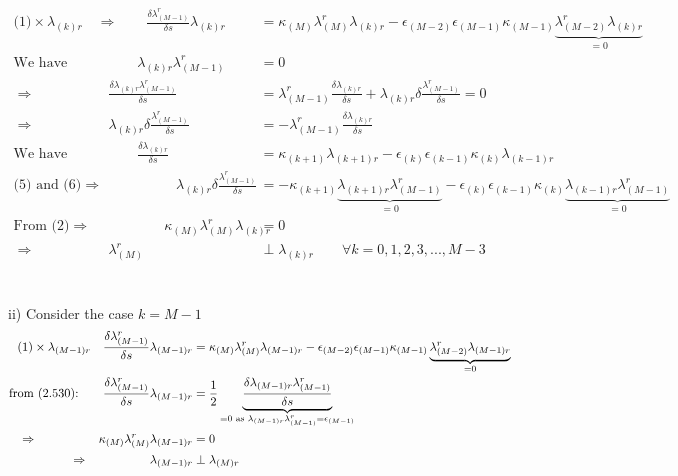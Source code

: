 \begin{align}
\text{(1)}\times \lambda_{(k)r}\quad\Rightarrow\quad\quad \frac{\delta\lambda_{(M-1)}^r}{\delta s}\lambda_{(k)r} &= \kappa_{(M)}\lambda^r_{(M)}\lambda_{(k)r} - \epsilon_{(M-2)}\epsilon_{(M-1)}\kappa_{(M-1)}\underbrace{\lambda^r_{(M-2)}\lambda_{(k)r}}_{=0}\\
\text{We have}  \quad \quad\quad\quad\quad\lambda_{(k)r}\lambda^r_{(M-1)} &=0\\
\Rightarrow \quad \quad\quad\quad\quad\ \frac{\delta\lambda_{(k)r}\lambda_{(M-1)}^r}{\delta s} &= \lambda_{(M-1)}^r\frac{\delta\lambda_{(k)r}}{\delta s}+\lambda_{(k)r}\delta\frac{\lambda_{(M-1)}^r}{\delta s}=0\\
\Rightarrow \quad \quad\quad\quad\quad\ \lambda_{(k)r}\delta\frac{\lambda_{(M-1)}^r}{\delta s} &= - \lambda_{(M-1)}^r\frac{\delta\lambda_{(k)r}}{\delta s}\\
\text{We have}\quad \quad\quad\quad\quad\frac{\delta\lambda_{(k)r}}{\delta s} &= \kappa_{(k+1)}\lambda_{(k+1)r} - \epsilon_{(k)}\epsilon_{(k-1)}\kappa_{(k)}\lambda_{(k-1)r}\\
\text{(5) and (6)}\Rightarrow \quad \quad\quad\quad\quad\ \lambda_{(k)r}\delta\frac{\lambda_{(M-1)}^r}{\delta s} &= -\kappa_{(k+1)}\underbrace{\lambda_{(k+1)r} \lambda_{(M-1)}^r}_{=0} - \epsilon_{(k)}\epsilon_{(k-1)}\kappa_{(k)}\underbrace{\lambda_{(k-1)r}\lambda_{(M-1)}^r}_{=0}\\
\text{From (2)}\Rightarrow \quad \quad\quad\quad\quad\ \kappa_{(M)}\lambda^r_{(M)}\lambda_{(k)r}&=0\\
\Rightarrow \quad \quad\quad\quad\quad\ \lambda^r_{(M)}& \perp\lambda_{(k)r}\quad\quad \forall k= 0,1,2,3,..., M-3 
\end{align}\\\\
ii) Consider the case $k = M-1$\\\begin{align}
\text{(1)}\times \lambda_{(M-1)r}\quad \frac{\delta\lambda_{(M-1)}^r}{\delta s}\lambda_{(M-1)r} &= \kappa_{(M)}\lambda^r_{(M)}\lambda_{(M-1)r} - \epsilon_{(M-2)}\epsilon_{(M-1)}\kappa_{(M-1)}\underbrace{\lambda^r_{(M-2)}\lambda_{(M-1)r}}_{=0}\\
\text{from (2.530):}\quad\quad \frac{\delta\lambda_{(M-1)}^r}{\delta s}\lambda_{(M-1)r}  &= \frac{1}{2}\underbrace{\frac{\delta\lambda_{(M-1)r}\lambda_{(M-1)}^r}{\delta s}}_{=0\text{ as }\lambda_{(M-1)r}\lambda_{(M-1)}^r =  \epsilon_{(M-1)}}\\
\Rightarrow \quad \quad\quad\quad\quad \kappa_{(M)}\lambda^r_{(M)}\lambda_{(M-1)r}&=0\\
\Rightarrow \quad \quad\quad\quad\quad \lambda_{(M-1)r} & \perp\lambda_{(M)r}
\end{align}

